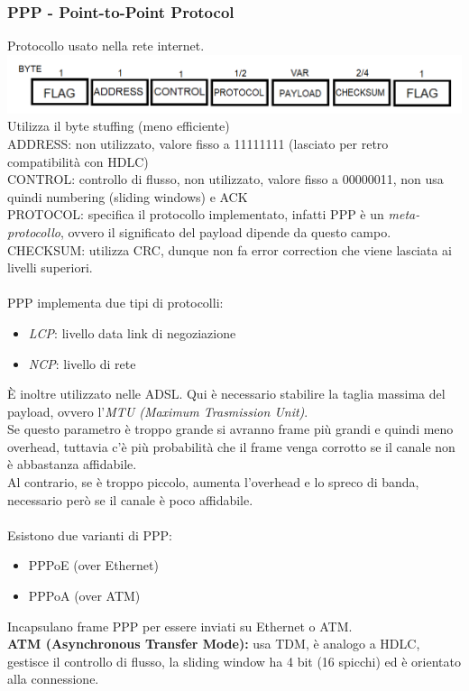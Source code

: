 \documentclass[10pt,a4paper,twoside]{article}
\begin{document}
\subsubsection{PPP - Point-to-Point Protocol}
Protocollo usato nella rete internet.\\
\includegraphics[width=\textwidth]{images/ppp.png}\\
Utilizza il byte stuffing (meno efficiente)\\
ADDRESS: non utilizzato, valore fisso a 11111111 (lasciato per retro compatibilità con HDLC)\\
CONTROL: controllo di flusso, non utilizzato, valore fisso a 00000011, non usa quindi numbering (sliding windows) e ACK\\
PROTOCOL: specifica il protocollo implementato, infatti PPP è un \textit{meta-protocollo}, ovvero il significato del payload dipende da questo campo.\\
CHECKSUM: utilizza CRC, dunque non fa error correction che viene lasciata ai livelli superiori.\\\\
PPP implementa due tipi di protocolli:
\begin{itemize}
\item \textit{LCP}: livello data link di negoziazione
\item \textit{NCP}: livello di rete
\end{itemize}
È inoltre utilizzato nelle ADSL. Qui è necessario stabilire la taglia massima del payload, ovvero l'\textit{MTU (Maximum Trasmission Unit)}.\\
Se questo parametro è troppo grande si avranno frame più grandi e quindi meno overhead, tuttavia c'è più probabilità che il frame venga corrotto se il canale non è abbastanza affidabile.\\
Al contrario, se è troppo piccolo, aumenta l'overhead e lo spreco di banda, necessario però se il canale è poco affidabile.\\\\
Esistono due varianti di PPP:
\begin{itemize}
\item PPPoE (over Ethernet)
\item PPPoA (over ATM)
\end{itemize}
Incapsulano frame PPP per essere inviati su Ethernet o ATM.\\
\textbf{ATM (Asynchronous Transfer Mode):} usa TDM, è analogo a HDLC, gestisce il controllo di flusso, la sliding window ha 4 bit (16 spicchi) ed è orientato alla connessione.
\end{document}
